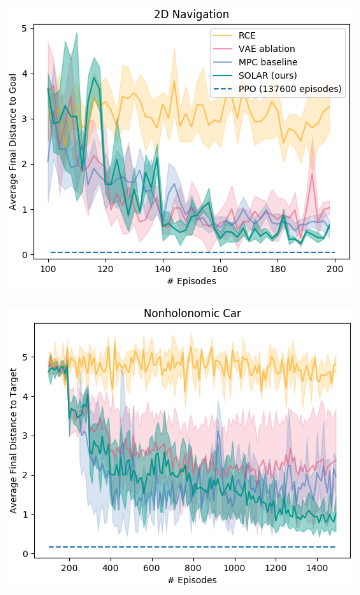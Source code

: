 \begin{figure}
    \centering
    \begin{subfigure}{0.32\linewidth}
        \includegraphics[width=\linewidth]{img/solar/2dnav-lin.png}
        \caption{}
    \end{subfigure}
    \begin{subfigure}{0.32\linewidth}
        \includegraphics[width=\linewidth]{img/solar/car-lin.png}
        \caption{}
    \end{subfigure}
    \begin{subfigure}{0.33\linewidth}

\end{subfigure}
\end{figure}

